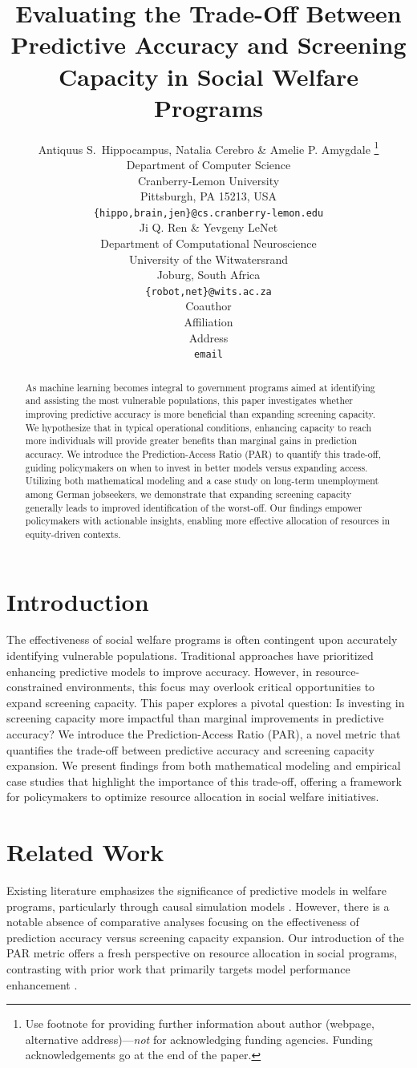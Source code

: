 \documentclass{article} %
\title{Evaluating the Trade-Off Between Predictive Accuracy and Screening Capacity in Social Welfare Programs}
\author{Antiquus S.~Hippocampus, Natalia Cerebro \& Amelie P. Amygdale \thanks{ Use footnote for providing further information
about author (webpage, alternative address)---\emph{not} for acknowledging
funding agencies.  Funding acknowledgements go at the end of the paper.} \\
Department of Computer Science\\
Cranberry-Lemon University\\
Pittsburgh, PA 15213, USA \\
\texttt{\{hippo,brain,jen\}@cs.cranberry-lemon.edu} \\
\And
Ji Q. Ren \& Yevgeny LeNet \\
Department of Computational Neuroscience \\
University of the Witwatersrand \\
Joburg, South Africa \\
\texttt{\{robot,net\}@wits.ac.za} \\
\AND
Coauthor \\
Affiliation \\
Address \\
\texttt{email}
}
\begin{document}
\maketitle

\begin{abstract}
As machine learning becomes integral to government programs aimed at identifying and assisting the most vulnerable populations, this paper investigates whether improving predictive accuracy is more beneficial than expanding screening capacity. We hypothesize that in typical operational conditions, enhancing capacity to reach more individuals will provide greater benefits than marginal gains in prediction accuracy. We introduce the Prediction-Access Ratio (PAR) to quantify this trade-off, guiding policymakers on when to invest in better models versus expanding access. Utilizing both mathematical modeling and a case study on long-term unemployment among German jobseekers, we demonstrate that expanding screening capacity generally leads to improved identification of the worst-off. Our findings empower policymakers with actionable insights, enabling more effective allocation of resources in equity-driven contexts.
\end{abstract}

\section{Introduction}
The effectiveness of social welfare programs is often contingent upon accurately identifying vulnerable populations. Traditional approaches have prioritized enhancing predictive models to improve accuracy. However, in resource-constrained environments, this focus may overlook critical opportunities to expand screening capacity. This paper explores a pivotal question: Is investing in screening capacity more impactful than marginal improvements in predictive accuracy? We introduce the Prediction-Access Ratio (PAR), a novel metric that quantifies the trade-off between predictive accuracy and screening capacity expansion. We present findings from both mathematical modeling and empirical case studies that highlight the importance of this trade-off, offering a framework for policymakers to optimize resource allocation in social welfare initiatives.

\section{Related Work}
Existing literature emphasizes the significance of predictive models in welfare programs, particularly through causal simulation models \citep{irfiansyah2023implementationom, orhan2024computationalmm}. However, there is a notable absence of comparative analyses focusing on the effectiveness of prediction accuracy versus screening capacity expansion. Our introduction of the PAR metric offers a fresh perspective on resource allocation in social programs, contrasting with prior work that primarily targets model performance enhancement \citep{merluzzi2021wirelessem, ordonez2025intelligentec}.
\end{document}
